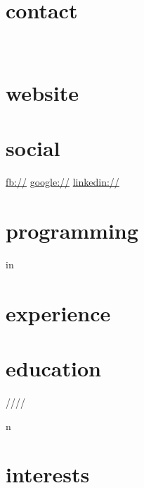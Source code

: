 \documentclass[]{fancy-cv}
\begin{document}
\header{\MakeLowercase\myfirstname}{\MakeLowercase\mylastname}{\MakeLowercase\mytitle}

\begin{aside}
  \section{contact}
    \href{mailto:\myemail}{\myemail}
    ~
    \myphone
    ~
    \myaddress%
    \mycity
  \section{website}
    \href{\mywebsite}{\mywebsite}
  \section{social}
    \href{http://facebook.com/\myfb}{fb://\myfb}
    \href{http://plug.google.com/\mygp}{google://\mygp}
    \href{http://www.linkedin.com/in/\mylinkedin}{linkedin://\mylinkedin}
  \section{programming}
     \lang in \programming {%
      \lang
    }%
\end{aside}

\section{experience}
\label{sec:experience}


\vspace{-2.5em}

\section{education}
\label{sec:education}

\begin{entrylist}
 \year/\degree/\school/\city/\subtitle in \education {
  \entry{\year}{\degree}{\school}{\subtitle}
}
\end{entrylist}

\vspace{-1em}
\section{interests}
\MakeLowercase\interests
\end{document}
